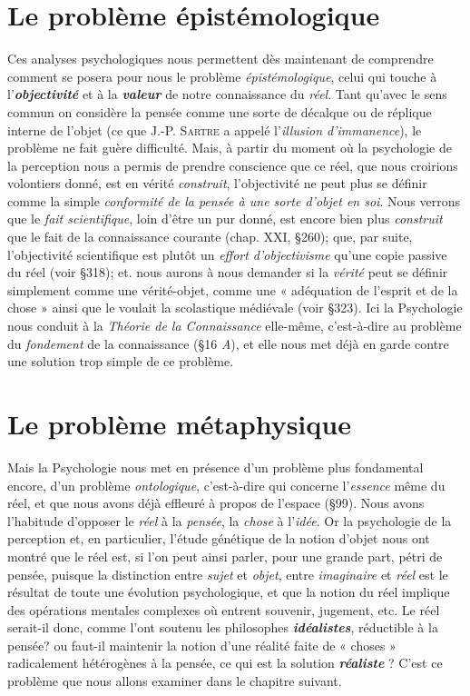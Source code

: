 \section{Le problème épistémologique}%
Ces analyses psychologiques
nous permettent dès maintenant de comprendre comment se
posera pour nous le problème {\it épistémologique}, celui qui touche à
l’\textbf{\textit {objectivité}} et à la \textbf{\textit {valeur}} de notre connaissance du {\it réel}. Tant qu'avec
le sens commun on considère la pensée comme une sorte de décalque
ou de réplique interne de l’objet (ce que J.-P. \textsc{Sartre} a appelé
l'{\it illusion d’immanence}), le problème ne fait guère difficulté. Mais, à
partir du moment où la psychologie de la perception nous a permis
de prendre conscience que ce réel, que nous croirions volontiers donné,
est en vérité {\it construit}, l’objectivité ne peut plus se définir comme la
simple {\it conformité de la pensée à une sorte d'objet en soi}. Nous verrons
que le {\it fait scientifique}, loin d’être un pur donné, est encore bien plus
{\it construit} que le fait de la connaissance courante (chap. XXI, \S 260); que,
par suite, l’objectivité scientifique est plutôt un {\it effort d’objectivisme}
qu’une copie passive du réel (voir \S 318); et. nous aurons à nous
demander si la {\it vérité} peut se définir simplement comme une vérité-objet,
comme une « adéquation de l'esprit et de la chose » ainsi que
le voulait la scolastique médiévale (voir \S 323). Ici la Psychologie
nous conduit à la {\it Théorie de la Connaissance} elle-même, c’est-à-dire
au problème du {\it fondement} de la connaissance (\S 16 {\it A}), et elle nous
met déjà en garde contre une solution trop simple de ce problème.

\section{Le problème métaphysique}%
Mais la Psychologie nous
met en présence d’un problème plus fondamental encore, d’un problème
{\it ontologique}, c’est-à-dire qui concerne l’{\it essence} même du réel, et
que nous avons déjà effleuré à propos de l’espace (\S 99). Nous avons
l’habitude d’opposer le {\it réel} à la {\it pensée}, la {\it chose} à l’{\it idée}. Or la psychologie
de la perception et, en particulier, l'étude génétique de la notion
d’objet nous ont montré que le réel est, si l’on peut ainsi parler, pour
une grande part, pétri de pensée, puisque la distinction entre {\it sujet}
et {\it objet}, entre {\it imaginaire} et {\it réel} est le résultat de toute une évolution
psychologique, et que la notion du réel implique des opérations
mentales complexes où entrent souvenir, jugement, etc. Le réel
serait-il donc, comme l’ont soutenu les philosophes \textbf{\textit {idéalistes}}, réductible
à la pensée? ou faut-il maintenir la notion d’une réalité faite
de « choses » radicalement hétérogènes à la pensée, ce qui est la solution
\textbf{\textit {réaliste}} ? C’est ce problème que nous allons examiner dans le
chapitre suivant.

